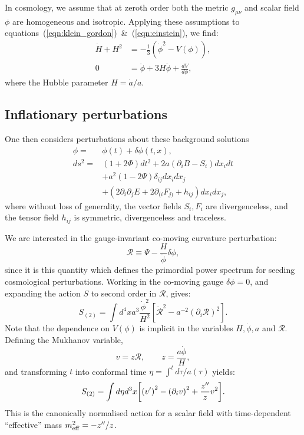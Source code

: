 In cosmology, we assume that at zeroth order both the metric $g_{\mu\nu}$ and scalar field $\phi$ are homogeneous and isotropic. Applying these assumptions to equations~(\ref{eqn:klein_gordon})~\&~(\ref{eqn:einstein}), we find:
\begin{align}
  \dot{H}+H^2 &= -\frac{1}{3}\left( \dot{\phi}^2 - V(\phi) \right),
  \label{eqn:Raychaudhuri}\\
  0&=\ddot{\phi} + 3H\dot{\phi} + \frac{dV}{d\phi},
\end{align}
where the Hubble parameter $H = \dot{a}/a$.

\subsection{Inflationary perturbations}
One then considers perturbations about these background solutions 
\begin{align}
  \phi=&\phi(t) + \delta\phi(t,x),
  \label{eqn:phi_perturbation} \\
  ds^2 =& (1+2\Phi)dt^2 + 2a\left( \partial_i B-S_i \right)dx_idt \nonumber\\
  &+a^2(1-2\Psi)\delta_{ij}dx_idx_j \nonumber\\
  &+\left( 2\partial_i\partial_jE + 2\partial_{(i}F_{j)} + h_{ij} \right)dx_idx_j,
\end{align}
where without loss of generality, the vector fields $S_i,F_i$ are divergenceless, and the tensor field $h_{ij}$ is symmetric, divergenceless and traceless.

We are interested in the gauge-invariant co-moving curvature perturbation:
\begin{equation}
  \mathcal{R}\equiv \Psi - \frac{H}{\dot{\phi}}\delta\phi,
  \label{eqn:R_action}
\end{equation}
since it is this quantity which defines the primordial power spectrum for seeding cosmological perturbations. Working in the co-moving gauge $\delta\phi=0$, and expanding the action $S$ to second order in $\mathcal{R}$, gives:
\begin{equation}
  S_{(2)} =  \int d^4 x a^3\frac{\dot{\phi}^2}{H^2}{\left[ \dot{\mathcal{R}}^2 - a^{-2} {\left( \partial_i\mathcal{R} \right)}^2 \right]}.
  \label{eqn:R_action}
\end{equation}
Note that the dependence on $V(\phi)$ is implicit in the variables $H,\dot{\phi},a$ and $\mathcal{R}$.
Defining the Mukhanov variable,
\begin{equation}
  v = z\mathcal{R},\qquad z=\frac{a\dot{\phi}}{H},
  \label{eqn:mukhanov_variable}
\end{equation}
and transforming $t$ into conformal time $\eta = \int^t d\tau/a(\tau) $ yields:
\begin{equation}                                 
  S_{(2)} =  \int d\eta d^3x {\left[ {\left( {{v}^\prime} \right)}^2 - {\left( \partial_iv \right)}^2 + \frac{{{z}^{\prime\prime}}}{z} v^2 \right]}.
  \label{eqn:v_action}
\end{equation}
This is the canonically normalised action for a scalar field with time-dependent ``effective'' mass $m_\mathrm{eff}^2 = -{{z}^{\prime\prime}}/z$.

